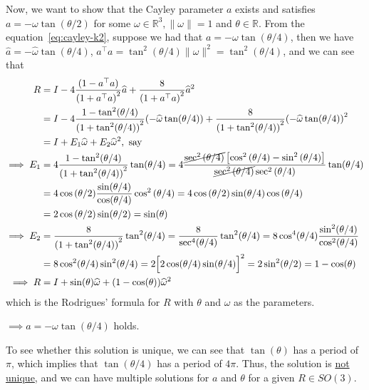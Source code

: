 \clearpage
Now, we want to show that the Cayley parameter \( a \) exists and satisfies \( a = -\omega \tan(\theta / 2) \) for some \( \omega \in \mathbb{R}^{3}, \| \omega \| = 1 \) and \( \theta \in \mathbb{R} \).
From the equation~\eqref{eq:cayley-k2}, suppose we had that \( a = -\omega \tan(\theta / 4) \), then we have \( \widehat{a} = -\widehat{\omega} \tan(\theta / 4) \), \( a^\top a = \tan^{2}(\theta / 4) \| \omega \|^{2} = \tan^{2}(\theta / 4) \), and we can see that
\begin{align*}
    R
     & =
    I - 4 \frac{(1 - a^{\top} a)}{{(1 + a^{\top} a)}^{2}} \widehat{a} + \frac{8}{{(1 + a^{\top} a)}^{2}} \widehat{a}^{2}
    \\ & =
    I - 4 \frac{1 - \tan^{2}(\theta / 4)}{{(1 + \tan^{2}(\theta / 4))}^{2}}{(-\widehat{\omega} \tan(\theta / 4))} + \frac{8}{{(1 + \tan^{2}(\theta / 4))}^{2}}{(-\widehat{\omega} \tan(\theta / 4))}^{2}
    \\ & =
    I + E_1 \widehat{\omega} + E_2 \widehat{\omega}^{2}, \text{ say}
    \\
    \implies
    E_1
     & =
    4 \frac{1 - \tan^{2}(\theta / 4)}{{(1 + \tan^{2}(\theta / 4))}^{2}} \tan(\theta / 4)
    =
    4
    \frac{ \cancel{\sec^{2}{(\theta / 4)}} \left[ \cos^{2}{(\theta / 4)} - \sin^{2}{(\theta / 4)} \right] }{ \cancel{\sec^{2}{(\theta / 4)}} \sec^{2}{(\theta / 4)} }
    \tan(\theta / 4)
    \\ & =
    4 \cos{(\theta / 2)} \frac{\sin(\theta / 4)}{\cos(\theta / 4)} \cos^{2}{(\theta / 4)}
    =
    4 \cos{(\theta / 2)} \sin(\theta / 4) \cos{(\theta / 4)}
    \\ & =
    2 \cos{(\theta / 2)} \sin(\theta / 2)
    =
    \sin(\theta)
    \\
    \implies
    E_2
     & =
    \frac{8}{{(1 + \tan^{2}(\theta / 4))}^{2}} \tan^{2}(\theta / 4)
    =
    \frac{8}{{\sec^{4}(\theta / 4)}} \tan^{2}(\theta / 4)
    =
    8 \cos^{4}(\theta / 4) \frac{\sin^{2}(\theta / 4)}{\cos^{2}(\theta / 4)}
    \\ & =
    8 \cos^{2}(\theta / 4) \sin^{2}(\theta / 4)
    =
    2 {\Big[ 2 \cos(\theta / 4) \sin(\theta / 4) \Big]}^{2}
    =
    2 \sin^{2}(\theta / 2)
    =
    1 - \cos(\theta)
    \\
    \implies
    R
     & =
    I + \sin(\theta) \widehat{\omega} + (1 - \cos(\theta)) \widehat{\omega}^{2}
\end{align*}
which is the Rodrigues' formula for \( R \) with \( \theta \) and \( \omega \) as the parameters.

\( \implies \boxed{a = -\omega \tan(\theta / 4)} \) holds.

To see whether this solution is unique, we can see that \( \tan(\theta) \) has a period of \( \pi \), which implies that \( \tan(\theta / 4) \) has a period of \( 4\pi \).
Thus, the solution is \underline{not unique}, and we can have multiple solutions for \( a \) and \( \theta \) for a given \( R \in SO(3) \).
